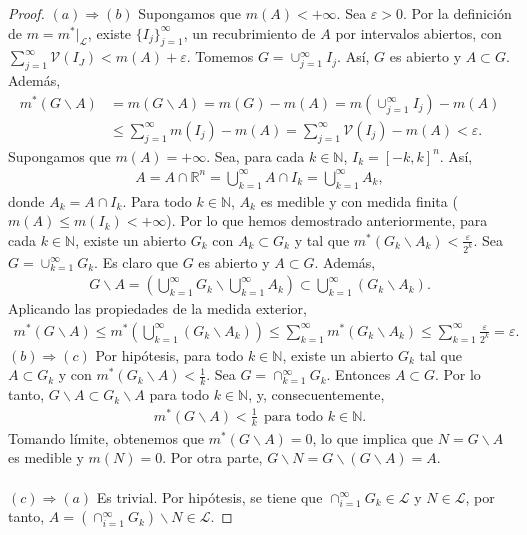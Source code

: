 \begin{proof}
$(a) \Longrightarrow (b)$ Supongamos que $m(A) < +\infty$. Sea $\varepsilon > 0$. Por la definición de $m = m^*|_{\mathcal{L}}$, existe $\{I_j\}_{j=1}^{\infty}$, un recubrimiento de $A$ por intervalos abiertos, con $\sum_{j=1}^{\infty}{\mathcal{V}(I_J)} < m(A) + \varepsilon$. Tomemos $G = \cup_{j=1}^{\infty}{I_j}$. Así, $G$ es abierto y $A \subset G$. Además,
\begin{align*}
    m^*(G \backslash A) &= m(G \backslash A) = m(G) - m(A) = m(\cup_{j=1}^{\infty}{I_j}) -  m(A) \\
    & \leq \sum_{j=1}^{\infty}{m(I_j)} - m(A) = \sum_{j=1}^{\infty}{\mathcal{V}(I_j)} - m(A) < \varepsilon.
\end{align*}
Supongamos que $m(A) = +\infty$. Sea, para cada $k \in \mathbb{N}$, $I_k = [-k,k]^n$. Así,
\begin{align*}
    A = A \cap \mathbb{R}^n = \bigcup_{k=1}^{\infty}{A \cap I_k} = \bigcup_{k=1}^{\infty}{A_k},
\end{align*}
donde $A_k = A \cap I_k$. Para todo $k \in \mathbb{N}$, $A_k$ es medible y con medida finita ($m(A) \leq m(I_k) < +\infty$). Por lo que hemos demostrado anteriormente, para cada $k \in \mathbb{N}$, existe un abierto $G_k$ con $A_k \subset G_k$ y tal que $m^*(G_k \backslash A_k) < \frac{\varepsilon}{2^k}$. Sea $G = \cup_{k=1}^{\infty}{G_k}$. Es claro que $G$ es abierto y $A \subset G$. Además,
\begin{align*}
    G \backslash A = \left( \bigcup_{k=1}^{\infty}{G_k} \backslash \bigcup_{k=1}^{\infty}{A_k} \right) \subset \bigcup_{k=1}^{\infty}{(G_k \backslash A_k)}.
\end{align*}
Aplicando las propiedades de la medida exterior,
\begin{align*}
    m^*(G \backslash A) \leq m^*\left(  \bigcup_{k=1}^{\infty}{(G_k \backslash A_k)} \right) \leq \sum_{k=1}^{\infty}{m^*(G_k \backslash A_k)} \leq \sum_{k=1}^{\infty}{\frac{\varepsilon}{2^k}} = \varepsilon.
\end{align*}
$(b) \Longrightarrow (c)$ Por hipótesis, para todo $k \in \mathbb{N}$, existe un abierto $G_k$ tal que $A \subset G_k$ y con $m^*(G_k \backslash A) < \frac{1}{k}$. Sea $G = \cap_{k=1}^{\infty}{G_k}$. Entonces $A \subset G$. Por lo tanto, $G \backslash A \subset G_k \backslash A$ para todo $k \in \mathbb{N}$, y, consecuentemente,
\begin{align*}
    m^*(G \backslash A) < \frac{1}{k} \ \ \text{para todo } k \in \mathbb{N}.
\end{align*}
Tomando límite, obtenemos que $m^*(G \backslash A) = 0$, lo que implica que $N = G \backslash A$ es medible y $m(N) = 0$. Por otra parte, $G \backslash N = G \backslash (G \backslash A) = A$.
\\
\\
\nenwline
$(c) \Longrightarrow (a)$ Es trivial. Por hipótesis, se tiene que $\cap_{i=1}^{\infty}{G_k} \in \mathcal{L}$ y $N \in \mathcal{L}$, por tanto, $A = (\cap_{i=1}^{\infty}{G_k}) \backslash N \in \mathcal{L}$.
\end{proof}

